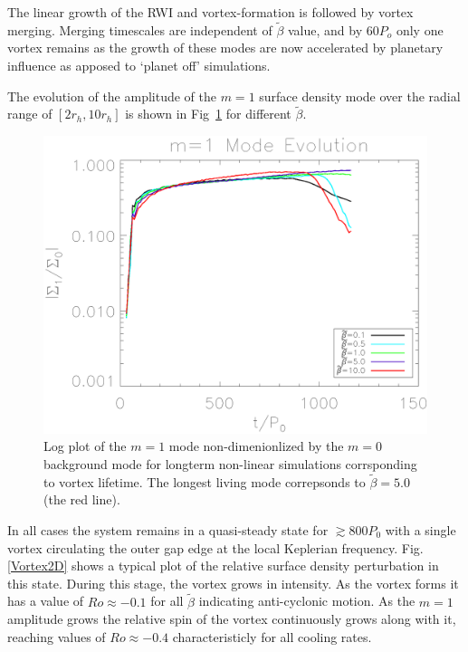 The linear growth of the RWI and vortex-formation is followed by 
vortex merging. Merging timescales are independent of $\tilde\beta$ value,
 and by $60P_o$ only one vortex remains as the growth of these modes are now
 accelerated by planetary influence as apposed to `planet off' simulations.

The evolution of the amplitude of the $m=1$ surface density mode
 over the radial range of $[2r_h,10r_h]$ is shown in Fig~\ref{lifetimeplot}
 for different $\tilde\beta$.


\begin{figure}
  \includegraphics[width=\linewidth,clip=true,trim=0.5cm
    0cm 0cm 1cm]{figures/longterm_stability}
  \caption{Log plot of the $m=1$ mode non-dimenionlized by the $m=0$
    background mode for longterm non-linear simulations corrsponding
    to vortex lifetime. The longest living mode correpsonds to
    $\tilde\beta=5.0$ (the red line). \label{lifetimeplot}} 
\end{figure}

In all cases the system remains in a quasi-steady state for
$\gtrsim800P_0$ with a single vortex circulating 
the outer gap edge at the local Keplerian  
frequency. Fig. \ref{Vortex2D} shows a typical plot of the relative 
surface density perturbation in this state. During this stage, the 
vortex grows in intensity. As the vortex forms it has a
 value of $Ro\approx-0.1$ for all $\tilde\beta$
 indicating anti-cyclonic
motion. As the $m=1$ amplitude grows the relative spin of the vortex
continuously grows along with it, reaching values of
$Ro\approx-0.4$ characteristicly for all cooling rates.

